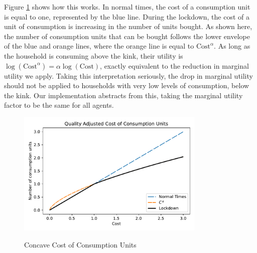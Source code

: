 \documentclass[./ConsumptionResponse]{subfiles}
\begin{document}
Figure \ref{concave_cons} shows how this works.
In normal times, the cost of a consumption unit is equal to one, represented by the blue line.
During the lockdown, the cost of a unit of consumption is increasing in the number of units bought.
As shown here, the number of consumption units that can be bought follows the lower envelope of the blue and orange lines, where the orange line is equal to $\text{Cost}^\alpha$.
As long as the household is consuming above the kink, their utility is $\log (\text{Cost}^\alpha) = \alpha \log (\text{Cost})$, exactly equivalent to the reduction in marginal utility we apply. Taking this interpretation seriously, the drop in marginal utility should not be applied to households with very low levels of consumption, below the kink.
Our implementation abstracts from this, taking the marginal utility factor to be the same for all agents.
\begin{figure}
	\centering
	\caption{Concave Cost of Consumption Units}
	\label{concave_cons}
	{ \includegraphics[width=0.8\textwidth]{./Figures/QualityCost}}
\end{figure}
\end{document}
